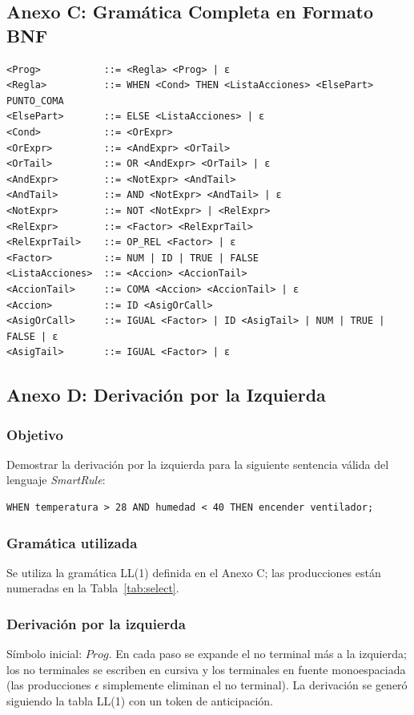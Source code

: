 \documentclass[12pt,a4paper]{article}
\begin{document}
\subsection{Anexo C: Gramática Completa en Formato BNF}
\begin{lstlisting}[style=grammartyle, caption={Gramática BNF completa de SmartRule}]
<Prog>           ::= <Regla> <Prog> | ε
<Regla>          ::= WHEN <Cond> THEN <ListaAcciones> <ElsePart> PUNTO_COMA
<ElsePart>       ::= ELSE <ListaAcciones> | ε
<Cond>           ::= <OrExpr>
<OrExpr>         ::= <AndExpr> <OrTail>
<OrTail>         ::= OR <AndExpr> <OrTail> | ε
<AndExpr>        ::= <NotExpr> <AndTail>
<AndTail>        ::= AND <NotExpr> <AndTail> | ε
<NotExpr>        ::= NOT <NotExpr> | <RelExpr>
<RelExpr>        ::= <Factor> <RelExprTail>
<RelExprTail>    ::= OP_REL <Factor> | ε
<Factor>         ::= NUM | ID | TRUE | FALSE
<ListaAcciones>  ::= <Accion> <AccionTail>
<AccionTail>     ::= COMA <Accion> <AccionTail> | ε
<Accion>         ::= ID <AsigOrCall>
<AsigOrCall>     ::= IGUAL <Factor> | ID <AsigTail> | NUM | TRUE | FALSE | ε
<AsigTail>       ::= IGUAL <Factor> | ε
\end{lstlisting}

\newpage
\subsection{Anexo D: Derivación por la Izquierda}

\subsubsection{Objetivo}
Demostrar la derivación por la izquierda para la siguiente sentencia válida del lenguaje \textit{SmartRule}:

\begin{lstlisting}[style=grammartyle]
WHEN temperatura > 28 AND humedad < 40 THEN encender ventilador;
\end{lstlisting}

\subsubsection{Gramática utilizada}
Se utiliza la gramática LL(1) definida en el Anexo C; las producciones están numeradas en la Tabla~\ref{tab:select}.

\subsubsection{Derivación por la izquierda}
Símbolo inicial: $\mathit{Prog}$. En cada paso se expande el no terminal más a la izquierda; los no terminales se escriben en cursiva y los terminales en fuente monoespaciada (las producciones $\epsilon$ simplemente eliminan el no terminal). La derivación se generó siguiendo la tabla LL(1) con un token de anticipación.
\end{document}
